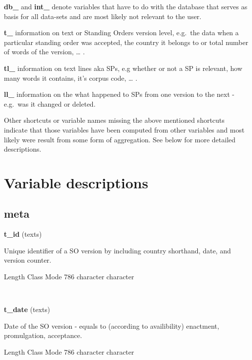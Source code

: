 \documentclass[]{article}
\newenvironment{Shaded}{\begin{snugshade}}{\end{snugshade}}
\newcommand{\DecValTok}[1]{\textcolor[rgb]{0.00,0.00,0.81}{{#1}}}
\newcommand{\NormalTok}[1]{{#1}}
\begin{document}
\textbf{db\_} and \textbf{int\_} denote variables that have to do with
the database that serves as basis for all data-sets and are most likely
not relevant to the user.

\textbf{t\_} information on text or Standing Orders version level,
e.g.~the data when a particular standing order was accepted, the country
it belongs to or total number of words of the version, \ldots{} .

\textbf{tl\_} information on text lines aka SPs, e.g whether or not a SP
is relevant, how many words it contains, it's corpus code, \ldots{} .

\textbf{ll\_} information on the what happened to SPs from one version
to the next - e.g.~was it changed or deleted.

Other shortcuts or variable names missing the above mentioned shortcuts
indicate that those variables have been computed from other variables
and most likely were result from some form of aggregation. See below for
more detailed descriptions.

\section{Variable descriptions}\label{variable-descriptions}

\subsection{meta}\label{meta}

\textbf{t\_id} (texts)

Unique identifier of a SO version by including country shorthand, date,
and version counter.

\begin{Shaded}
\begin{Highlighting}[]
   \NormalTok{Length     Class      Mode }
      \DecValTok{786} \NormalTok{character character }
\end{Highlighting}
\end{Shaded}

~

\vspace{1em}

\textbf{t\_date} (texts)

Date of the SO version - equals to (according to availibility)
enactment, promulgation, acceptance.

\begin{Shaded}
\begin{Highlighting}[]
   \NormalTok{Length     Class      Mode }
      \DecValTok{786} \NormalTok{character character }
\end{Highlighting}
\end{Shaded}
\end{document}

